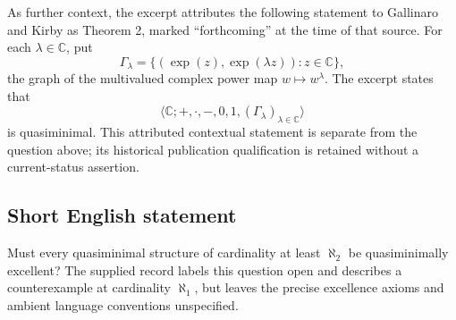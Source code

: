 \documentclass[11pt]{article}
\newcommand{\C}{\mathbb{C}}
\begin{document}
As further context, the excerpt attributes the following statement to Gallinaro and Kirby as Theorem 2, marked ``forthcoming'' at the time of that source. For each \(\lambda\in\C\), put
\[
\Gamma_\lambda=\{(\exp(z),\exp(\lambda z)):z\in\C\},
\]
the graph of the multivalued complex power map \(w\mapsto w^\lambda\). The excerpt states that
\[
\langle\C;+,\cdot,-,0,1,(\Gamma_\lambda)_{\lambda\in\C}\rangle
\]
is quasiminimal. This attributed contextual statement is separate from the question above; its historical publication qualification is retained without a current-status assertion.
\subsection{Short English statement}
Must every quasiminimal structure of cardinality at least \(\aleph_2\) be quasiminimally excellent? The supplied record labels this question open and describes a counterexample at cardinality \(\aleph_1\), but leaves the precise excellence axioms and ambient language conventions unspecified.
\end{document}
